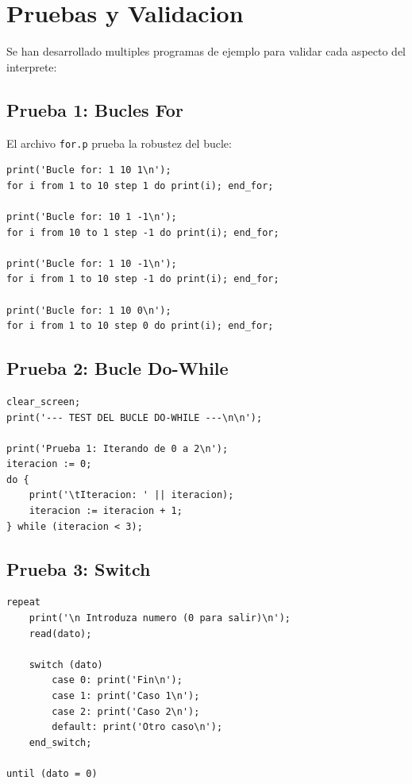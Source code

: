 \documentclass[11pt,a4paper]{article}
\begin{document}
\newpage

\section{Pruebas y Validacion}

Se han desarrollado multiples programas de ejemplo para validar cada aspecto del interprete:

\subsection{Prueba 1: Bucles For}

El archivo \texttt{for.p} prueba la robustez del bucle:

\begin{lstlisting}[caption={Programa: for.p}]
print('Bucle for: 1 10 1\n');
for i from 1 to 10 step 1 do print(i); end_for;

print('Bucle for: 10 1 -1\n');
for i from 10 to 1 step -1 do print(i); end_for;

print('Bucle for: 1 10 -1\n');
for i from 1 to 10 step -1 do print(i); end_for;

print('Bucle for: 1 10 0\n');
for i from 1 to 10 step 0 do print(i); end_for;
\end{lstlisting}

\subsection{Prueba 2: Bucle Do-While}

\begin{lstlisting}[caption={Programa: do\_while.p}]
clear_screen;
print('--- TEST DEL BUCLE DO-WHILE ---\n\n');

print('Prueba 1: Iterando de 0 a 2\n');
iteracion := 0;
do {
    print('\tIteracion: ' || iteracion);
    iteracion := iteracion + 1;
} while (iteracion < 3);
\end{lstlisting}

\subsection{Prueba 3: Switch}

\begin{lstlisting}[caption={Programa: test\_switch.p}]
repeat
    print('\n Introduza numero (0 para salir)\n');
    read(dato);
    
    switch (dato)
        case 0: print('Fin\n');
        case 1: print('Caso 1\n');
        case 2: print('Caso 2\n');
        default: print('Otro caso\n');
    end_switch;

until (dato = 0)
\end{lstlisting}
\end{document}
